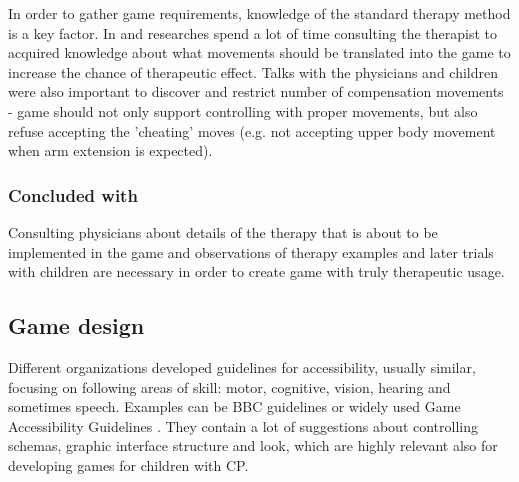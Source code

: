 In order to gather game requirements, knowledge of the standard therapy method is a key factor. In \cite{exercise} and \cite{tabletop} researches spend a lot of time consulting the therapist to acquired knowledge about what movements should be translated into the game to increase the chance of therapeutic effect. Talks with the physicians and children were also important to discover and restrict number of compensation movements - game should not only support controlling with proper movements, but also refuse accepting the 'cheating' moves (e.g. not accepting upper body movement when arm extension is expected).

\subsubsection{Concluded with}
Consulting physicians about details of the therapy that is about to be implemented in the game and observations of therapy examples and later trials with children are necessary in order to create game with truly therapeutic usage. 

\subsection{Game design}
Different organizations developed guidelines for accessibility, usually similar, focusing on following areas of skill: motor, cognitive, vision, hearing and sometimes speech. Examples can be BBC guidelines \cite{BBC} or widely used Game Accessibility Guidelines \cite{gag}. They contain a lot of suggestions about controlling schemas, graphic interface structure and look, which are highly relevant also for developing games for children with CP. 

